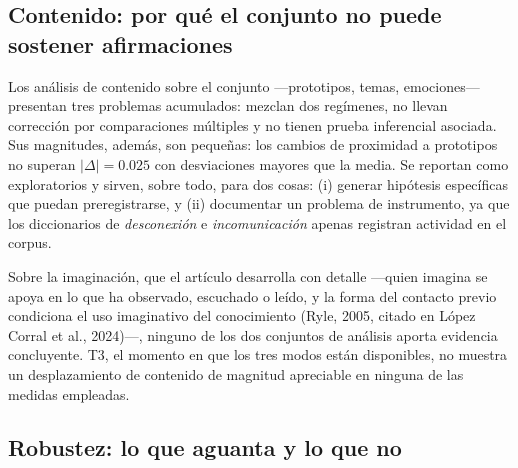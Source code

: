 \documentclass[12pt]{article}
\begin{document}
\subsection{Contenido: por qué el conjunto no puede sostener afirmaciones}

Los análisis de contenido sobre el conjunto —prototipos, temas, emociones— presentan tres
problemas acumulados: mezclan dos regímenes, no llevan corrección por comparaciones múltiples y
no tienen prueba inferencial asociada. Sus magnitudes, además, son pequeñas: los cambios de
proximidad a prototipos no superan $|\Delta| = 0.025$ con desviaciones mayores que la media. Se
reportan como exploratorios y sirven, sobre todo, para dos cosas: (i) generar hipótesis
específicas que puedan preregistrarse, y (ii) documentar un problema de instrumento, ya que los
diccionarios de \emph{desconexión} e \emph{incomunicación} apenas registran actividad en el
corpus.

Sobre la imaginación, que el artículo desarrolla con detalle —quien imagina se apoya en lo que
ha observado, escuchado o leído, y la forma del contacto previo condiciona el uso imaginativo
del conocimiento (Ryle, 2005, citado en López Corral et al., 2024)—, ninguno de los dos
conjuntos de análisis aporta evidencia concluyente. T3, el momento en que los tres modos están
disponibles, no muestra un desplazamiento de contenido de magnitud apreciable en ninguna de las
medidas empleadas.

\subsection{Robustez: lo que aguanta y lo que no}
\end{document}
